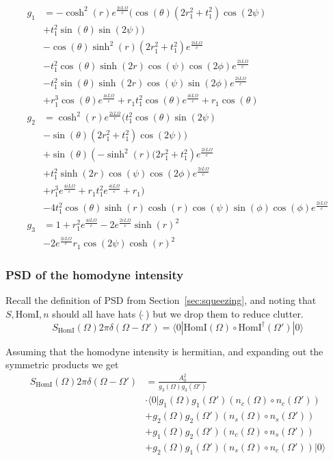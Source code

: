 \documentclass[aps,pra,superscriptaddress,reprint,nofootinbib]{revtex4-1}
\begin{document}
\begin{align*}
g_1 &= -\cosh ^2(r) e^{\frac{2 i L \Omega }{c}} (\cos (\theta ) \left(2 r_1^2+t_1^2\right) \cos (2 \psi )\\
	&+t_1^2	\sin (\theta ) \sin (2 \psi )) \\
	&-\cos (\theta ) \sinh ^2(r) \left(2 r_1^2+t_1^2\right) e^{\frac{2 i L \Omega
	}{c}}\\
	&-t_1^2 \cos (\theta ) \sinh (2 r) \cos (\psi ) \cos (2 \phi ) e^{\frac{2 i L \Omega }{c}}\\
	&-t_1^2 \sin (\theta )
	\sinh (2 r) \cos (\psi ) \sin (2 \phi ) e^{\frac{2 i L \Omega }{c}}\\
	&+r_1^3 \cos (\theta ) e^{\frac{4 i L \Omega
	}{c}}+r_1 t_1^2 \cos (\theta ) e^{\frac{4 i L \Omega }{c}}+r_1 \cos (\theta ) \\
g_2 &= \cosh ^2(r) e^{\frac{2 i L \Omega }{c}} (t_1^2 \cos (\theta ) \sin (2 \psi )\\
	&-\sin (\theta ) \left(2 r_1^2+t_1^2\right) \cos (2 \psi ))\\
	&+\sin (\theta ) \left(-\sinh ^2(r) (2 r_1^2+t_1^2\right)
	e^{\frac{2 i L \Omega }{c}}\\
	&+t_1^2 \sinh (2 r) \cos (\psi ) \cos (2 \phi ) e^{\frac{2 i L \Omega }{c}}\\
	&+r_1^3	e^{\frac{4 i L \Omega }{c}}+r_1 t_1^2 e^{\frac{4 i L \Omega }{c}}+r_1)\\
	&-4 t_1^2 \cos (\theta ) \sinh (r) \cosh (r) \cos (\psi ) \sin (\phi ) \cos (\phi ) e^{\frac{2 i L \Omega }{c}} \\
g_3 &= 1 + r_1^2 e^{\frac{4 i L \Omega}{c}} - 2 e^{\frac{2 i L \Omega}{c}} \sinh(r)^2 \\
	&- 2 e^{\frac{2 i L \Omega}{c}} r_1 \cos(2 \psi) \cosh(r)^2 
\end{align*}

\subsubsection{PSD of the homodyne intensity}

Recall the definition of PSD from Section~\ref{sec:squeezing}, and noting that $S, \mathrm{HomI}, n$ should all have hats (\,$\hat{}$\,) but we drop them to reduce clutter.
$$S_\mathrm{HomI}(\Omega) 2 \pi \delta(\Omega - \Omega') = \langle0| \mathrm{HomI}(\Omega) \circ \mathrm{HomI}^\dagger(\Omega') |0\rangle$$

Assuming that the homodyne intensity is hermitian, and expanding out the symmetric products we get
\begin{align*}
S_\mathrm{HomI}(\Omega) 2 \pi \delta(\Omega - \Omega') &= \frac{A_0^2}{g_3(\Omega) g_3(\Omega')} \\
&\cdot \langle0| g_1(\Omega) g_1(\Omega') (n_c(\Omega) \circ n_c(\Omega'))\\
&+ g_2(\Omega) g_2(\Omega') (n_s(\Omega) \circ n_s(\Omega')) \\
&+ g_1(\Omega) g_2(\Omega') (n_c(\Omega) \circ n_s(\Omega')) \\
&+ g_2(\Omega) g_1(\Omega') (n_s(\Omega) \circ n_c(\Omega')) |0\rangle
\end{align*}
\end{document}
